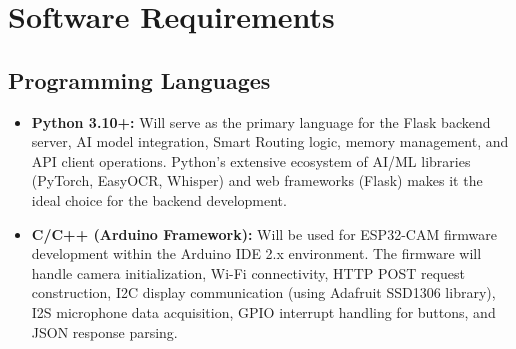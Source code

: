 \section{Software Requirements}

\subsection{Programming Languages}
\begin{itemize}[leftmargin=1.5cm]
\item \textbf{Python 3.10+:} Will serve as the primary language for the Flask backend server, AI model integration, Smart Routing logic, memory management, and API client operations. Python's extensive ecosystem of AI/ML libraries (PyTorch, EasyOCR, Whisper) and web frameworks (Flask) makes it the ideal choice for the backend development.

\item \textbf{C/C++ (Arduino Framework):} Will be used for ESP32-CAM firmware development within the Arduino IDE 2.x environment. The firmware will handle camera initialization, Wi-Fi connectivity, HTTP POST request construction, I2C display communication (using Adafruit SSD1306 library), I2S microphone data acquisition, GPIO interrupt handling for buttons, and JSON response parsing.
\end{itemize}

